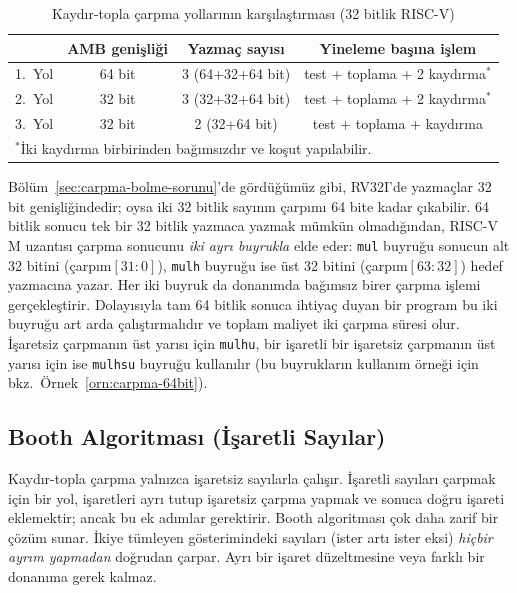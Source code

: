 \begin{table}[htbp]
\centering
\caption{Kaydır-topla çarpma yollarının karşılaştırması (32 bitlik RISC-V)}
\label{tab:carpma-yol-karsilastirma}
\small
\begin{tabular}{l c c c}
\toprule
& \textbf{AMB genişliği} & \textbf{Yazmaç sayısı} & \textbf{Yineleme başına işlem} \\
\midrule
1.\ Yol & 64 bit & 3 (64+32+64 bit) & test + toplama + 2 kaydırma$^*$ \\
2.\ Yol & 32 bit & 3 (32+32+64 bit) & test + toplama + 2 kaydırma$^*$ \\
3.\ Yol & 32 bit & 2 (32+64 bit) & test + toplama + kaydırma \\
\bottomrule
\multicolumn{4}{l}{\footnotesize $^*$İki kaydırma birbirinden bağımsızdır ve koşut yapılabilir.}
\end{tabular}
\end{table}

Bölüm~\ref{sec:carpma-bolme-sorunu}'de gördüğümüz gibi, RV32I'de yazmaçlar 32 bit genişliğindedir; oysa iki 32 bitlik sayının çarpımı 64 bite kadar çıkabilir. 64 bitlik sonucu tek bir 32 bitlik yazmaca yazmak mümkün olmadığından, RISC-V M uzantısı çarpma sonucunu \emph{iki ayrı buyrukla} elde eder: \texttt{mul} buyruğu sonucun alt 32 bitini (çarpım$[31{:}0]$), \texttt{mulh} buyruğu ise üst 32 bitini (çarpım$[63{:}32]$) hedef yazmacına yazar. Her iki buyruk da donanımda bağımsız birer çarpma işlemi gerçekleştirir. Dolayısıyla tam 64 bitlik sonuca ihtiyaç duyan bir program bu iki buyruğu art arda çalıştırmalıdır ve toplam maliyet iki çarpma süresi olur. İşaretsiz çarpmanın üst yarısı için \texttt{mulhu}, bir işaretli bir işaretsiz çarpmanın üst yarısı için ise \texttt{mulhsu} buyruğu kullanılır (bu buyrukların kullanım örneği için bkz.\ Örnek~\ref{orn:carpma-64bit}).

\subsection{Booth Algoritması (İşaretli Sayılar)}
\label{sec:booth}

Kaydır-topla çarpma yalnızca işaretsiz sayılarla çalışır. İşaretli sayıları çarpmak için bir yol, işaretleri ayrı tutup işaretsiz çarpma yapmak ve sonuca doğru işareti eklemektir; ancak bu ek adımlar gerektirir. Booth algoritması çok daha zarif bir çözüm sunar. İkiye tümleyen gösterimindeki sayıları (ister artı ister eksi) \emph{hiçbir ayrım yapmadan} doğrudan çarpar. Ayrı bir işaret düzeltmesine veya farklı bir donanıma gerek kalmaz.

